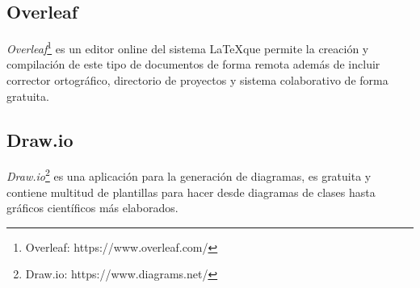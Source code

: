 \subsection{Overleaf}
\emph{Overleaf}\footnote{Overleaf: https://www.overleaf.com/} es un editor online del sistema \LaTeX que permite la creación y compilación de este tipo de documentos de forma remota además de incluir corrector ortográfico, directorio de proyectos y sistema colaborativo de forma gratuita.

\subsection{Draw.io}
\emph{Draw.io}\footnote{Draw.io: https://www.diagrams.net/} es una aplicación para la generación de diagramas, es gratuita y contiene multitud de plantillas para hacer desde diagramas de clases hasta gráficos científicos más elaborados.